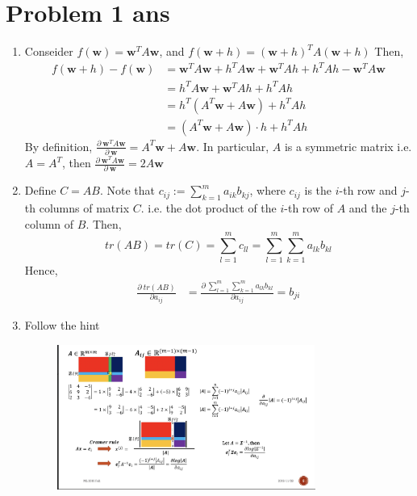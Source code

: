 \documentclass{article}
\begin{document}
\section*{Problem 1 ans}
\begin{enumerate}[label=(\alph*)]
    \item Conseider $f(\mathbf{w}) = \mathbf{w}^T A \mathbf{w}$, and $f(\mathbf{w}+h) = (\mathbf{w} + h)^T A (\mathbf{w} + h)$
    Then, 
    $$
    \begin{aligned}
    f(\mathbf{w}+h) - f(\mathbf{w}) &=  \mathbf{w}^T A\mathbf{w} + h^T A \mathbf{w} + \mathbf{w}^TA h + h^T A h -  \mathbf{w}^T A \mathbf{w}\\
    &= h^T A \mathbf{w} + \mathbf{w}^TA h + h^T A h\\
    &= h^T(A^T \mathbf{w} + A\mathbf{w}) + h^T A h\\
    &= (A^T \mathbf{w} + A\mathbf{w})\cdot h + h^T A h
    \end{aligned}
    $$
    By definition, $\frac{\partial\ \mathbf{w}^TA\mathbf{w}}{\partial\ \mathbf{w}} = A^T\mathbf{w} + A\mathbf{w}$. In particular, $A$ is a symmetric matrix i.e. $A = A^T$, then $\frac{\partial\ \mathbf{w}^TA\mathbf{w}}{\partial\ \mathbf{w}} = 2A\mathbf{w}$
    \item Define $C = AB$. Note that $c_{ij} := \sum_{k=1}^m a_{ik}b_{kj}$, where $c_{ij}$ is the $i$-th row and $j$-th columns of matrix $C$. i.e. the dot product of the $i$-th row of $A$ and the $j$-th column of $B$.
    Then, 
    $$
    tr(AB) = tr(C) = \sum_{l=1}^m c_{ll} = \sum_{l=1}^m\sum_{k=1}^m a_{lk}b_{kl}
    $$
    Hence, 
    $$
    \begin{aligned}
    \frac{\partial\ tr(AB)}{\partial a_{ij}} &= \frac{\partial\ \sum_{l=1}^m\sum_{k=1}^m a_{lk}b_{kl}}{\partial a_{ij}} =b_{ji}
    \end{aligned}
    $$
    \item Follow the hint
    \begin{figure}[h]
         \centering
         \includegraphics[width=0.8\textwidth]{hint.jpg}
     \end{figure}
\end{enumerate}
\end{document}
